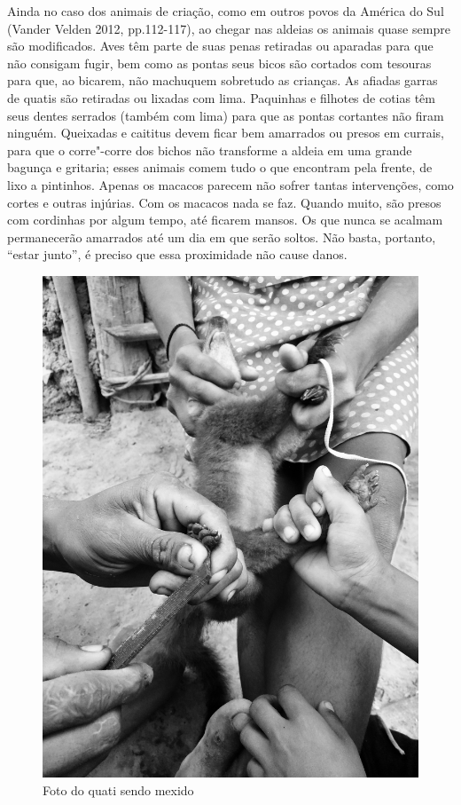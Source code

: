 Ainda no caso dos animais de criação, como em outros povos da América do
Sul (Vander Velden 2012, pp.112-117), ao chegar nas aldeias os animais
quase sempre são modificados. Aves têm parte de suas penas retiradas ou
aparadas para que não consigam fugir, bem como as pontas seus bicos são
cortados com tesouras para que, ao bicarem, não machuquem sobretudo as
crianças. As afiadas garras de quatis são retiradas ou lixadas com lima.
Paquinhas e filhotes de cotias têm seus dentes serrados (também com
lima) para que as pontas cortantes não firam ninguém. Queixadas e
caititus devem ficar bem amarrados ou presos em currais, para que o
corre"-corre dos bichos não transforme a aldeia em uma grande bagunça e
gritaria; esses animais comem tudo o que encontram pela frente, de lixo
a pintinhos. Apenas os macacos parecem não sofrer tantas intervenções,
como cortes e outras injúrias. Com os macacos nada se faz. Quando muito,
são presos com cordinhas por algum tempo, até ficarem mansos. Os que
nunca se acalmam permanecerão amarrados até um dia em que serão soltos.
Não basta, portanto, ``estar junto'', é preciso que essa proximidade não
cause danos.

\begin{figure}[H]
\centering
  \includegraphics[width=\textwidth]{./imgs/IMG_0343}
\caption{Foto do quati sendo mexido}
\end{figure}

